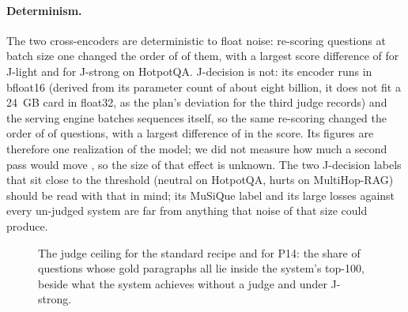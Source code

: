 \paragraph{Determinism.} The two cross-encoders are deterministic to float noise: re-scoring
\detQuestionsLightHotpot{} questions at batch size one changed the order of \detOrderChangedLightHotpot{} of them,
with a largest score difference of \detMaxDiffLightHotpot{} for J-light and \detMaxDiffStrongHotpot{} for
J-strong on HotpotQA. J-decision is not: its encoder runs in bfloat16 (derived from its parameter count of about eight billion, it does not fit a 24~GB card in float32, as the
plan's deviation for the third judge records) and the serving engine batches sequences itself, so the same re-scoring changed the order of
\detOrderChangedDecisionHotpot{} of \detQuestionsDecisionHotpot{} questions, with a largest difference of \detMaxDiffDecisionHotpot{} in the
score. Its figures are therefore one realization of the model; we did not measure how much a
second pass would move \FS, so the size of that effect is unknown. The two J-decision labels
that sit close to the threshold (neutral on HotpotQA, hurts on MultiHop-RAG) should be read
with that in mind; its MuSiQue label and its large losses against every un-judged system are
far from anything that noise of that size could produce.

\begin{figure}[t]
\centering

\caption{The judge ceiling for the standard recipe and for P14: the share of questions whose
gold paragraphs all lie inside the system's top-100, beside what \FS{} the system achieves
without a judge and under J-strong.}
\label{fig:ceiling}
\end{figure}

